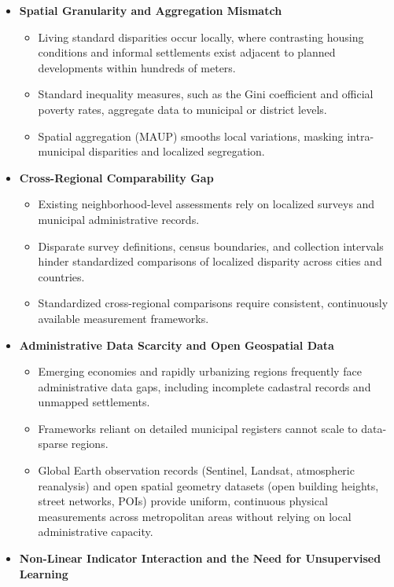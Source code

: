 \documentclass[11pt,a4paper]{article}
\begin{document}
\begin{itemize}[leftmargin=*]
    \item \textbf{Spatial Granularity and Aggregation Mismatch}
    \begin{itemize}
        \item Living standard disparities occur locally, where contrasting housing conditions and informal settlements exist adjacent to planned developments within hundreds of meters.
        \item Standard inequality measures, such as the Gini coefficient and official poverty rates, aggregate data to municipal or district levels.
        \item Spatial aggregation (MAUP) smooths local variations, masking intra-municipal disparities and localized segregation.
    \end{itemize}
    \item \textbf{Cross-Regional Comparability Gap}
    \begin{itemize}
        \item Existing neighborhood-level assessments rely on localized surveys and municipal administrative records.
        \item Disparate survey definitions, census boundaries, and collection intervals hinder standardized comparisons of localized disparity across cities and countries.
        \item Standardized cross-regional comparisons require consistent, continuously available measurement frameworks.
    \end{itemize}
    \item \textbf{Administrative Data Scarcity and Open Geospatial Data}
    \begin{itemize}
        \item Emerging economies and rapidly urbanizing regions frequently face administrative data gaps, including incomplete cadastral records and unmapped settlements.
        \item Frameworks reliant on detailed municipal registers cannot scale to data-sparse regions.
        \item Global Earth observation records (Sentinel, Landsat, atmospheric reanalysis) and open spatial geometry datasets (open building heights, street networks, POIs) provide uniform, continuous physical measurements across metropolitan areas without relying on local administrative capacity.
    \end{itemize}
    \item \textbf{Non-Linear Indicator Interaction and the Need for Unsupervised Learning}

\end{itemize}
\end{document}
